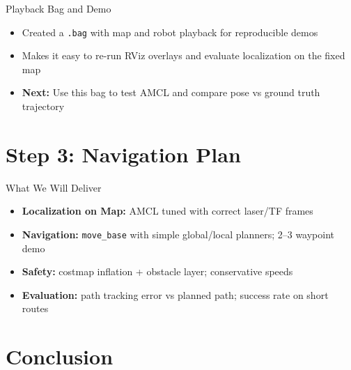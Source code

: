 \documentclass[10pt]{beamer}
\begin{document}
\begin{frame}{Playback Bag and Demo}
\begin{itemize}
    \item Created a \texttt{.bag} with map and robot playback for reproducible demos
    \item Makes it easy to re-run RViz overlays and evaluate localization on the fixed map
    \item \textbf{Next:} Use this bag to test AMCL and compare pose vs ground truth trajectory
\end{itemize}
\begin{center}
\end{center}
\end{frame}

\section{Step 3: Navigation Plan}

\begin{frame}{What We Will Deliver}
\begin{itemize}
    \item \textbf{Localization on Map:} AMCL tuned with correct laser/TF frames
    \item \textbf{Navigation:} \texttt{move\_base} with simple global/local planners; 2–3 waypoint demo
    \item \textbf{Safety:} costmap inflation + obstacle layer; conservative speeds
    \item \textbf{Evaluation:} path tracking error vs planned path; success rate on short routes
\end{itemize}
\end{frame}

\section{Conclusion}
\end{document}
